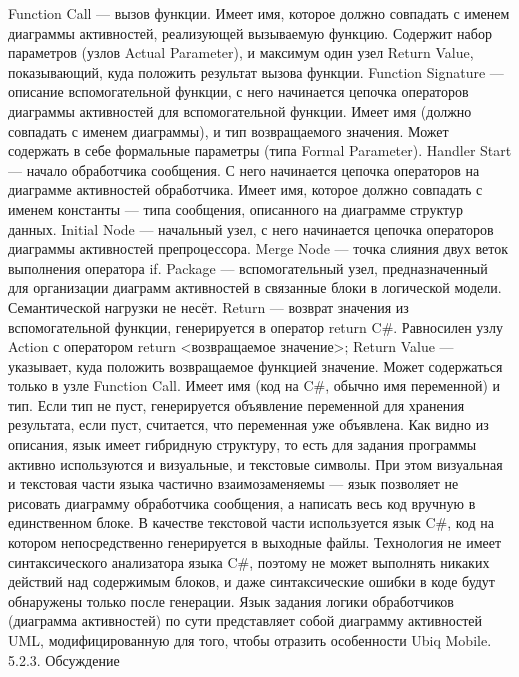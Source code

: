 Function Call --- вызов функции. Имеет имя, которое должно совпадать с именем диаграммы активностей, реализующей вызываемую функцию. Содержит набор параметров (узлов Actual Parameter), и максимум один узел Return Value, показывающий, куда положить результат вызова функции.
Function Signature --- описание вспомогательной функции, с него начинается цепочка операторов диаграммы активностей для вспомогательной функции. Имеет имя (должно совпадать с именем диаграммы), и тип возвращаемого значения. Может содержать в себе формальные параметры (типа Formal Parameter).
Handler Start --- начало обработчика сообщения. С него начинается цепочка операторов на диаграмме активностей обработчика. Имеет имя, которое должно совпадать с именем константы --- типа сообщения, описанного на диаграмме структур данных.
Initial Node --- начальный узел, с него начинается цепочка операторов диаграммы активностей препроцессора.
Merge Node --- точка слияния двух веток выполнения оператора if.
Package --- вспомогательный узел, предназначенный для организации диаграмм активностей в связанные блоки в логической модели. Семантической нагрузки не несёт.
Return --- возврат значения из вспомогательной функции, генерируется в оператор return C#. Равносилен узлу Action с оператором return <возвращаемое значение>;
Return Value --- указывает, куда положить возвращаемое функцией значение. Может содержаться только в узле Function Call. Имеет имя (код на C#, обычно имя переменной) и тип. Если тип не пуст, генерируется объявление переменной для хранения результата, если пуст, считается, что переменная уже объявлена.
	Как видно из описания, язык имеет гибридную структуру, то есть для задания программы активно используются и визуальные, и текстовые символы. При этом визуальная и текстовая части языка частично взаимозаменяемы --- язык позволяет не рисовать диаграмму обработчика сообщения, а написать весь код вручную в единственном блоке. В качестве текстовой части используется язык C#, код на котором непосредственно генерируется в выходные файлы. Технология не имеет синтаксического анализатора языка C#, поэтому не может выполнять никаких действий над содержимым блоков, и даже синтаксические ошибки в коде будут обнаружены только после генерации. Язык задания логики обработчиков (диаграмма активностей) по сути представляет собой диаграмму активностей UML, модифицированную для того, чтобы отразить особенности Ubiq Mobile.
5.2.3. Обсуждение
